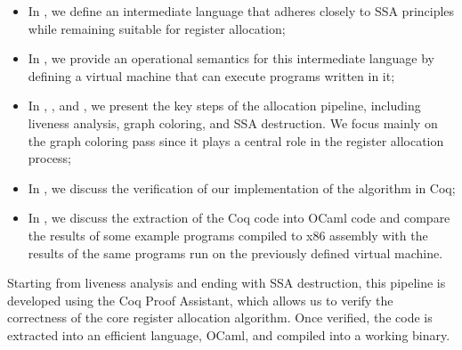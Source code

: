 \begin{itemize}
\item In , we define an intermediate language that adheres closely to SSA principles while remaining suitable for register allocation;
\item In , we provide an operational semantics for this intermediate language by defining a virtual machine that can execute programs written in it;
\item In , , and , we present the key steps of the allocation pipeline, including liveness analysis, graph coloring, and SSA destruction. We focus mainly on the graph coloring pass since it plays a central role in the register allocation process;
\item In , we discuss the verification of our implementation of the algorithm in Coq;
\item In , we discuss the extraction of the Coq code into OCaml code and compare the results of some example programs compiled to x86 assembly with the results of the same programs run on the previously defined virtual machine.
\end{itemize}

Starting from liveness analysis and ending with SSA destruction, this pipeline is developed using the Coq Proof Assistant, which allows us to verify the correctness of the core register allocation algorithm. Once verified, the code is extracted into an efficient language, OCaml, and compiled into a working binary.